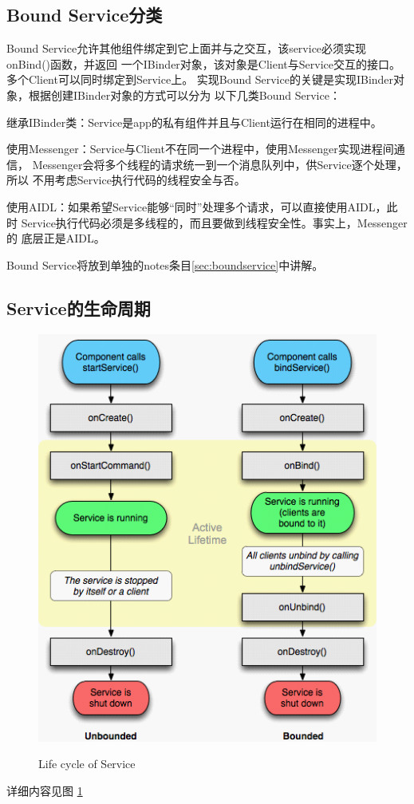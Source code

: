 ﻿\documentclass[a4paper,11pt]{article}
\begin{document}
  \subsection[Bound Service分类]{Bound Service分类}
  Bound Service允许其他组件绑定到它上面并与之交互，该service必须实现onBind()函数，并返回
  一个IBinder对象，该对象是Client与Service交互的接口。多个Client可以同时绑定到Service上。
  实现Bound Service的关键是实现IBinder对象，根据创建IBinder对象的方式可以分为
  以下几类Bound Service：\par
  \begin{coloredenumerate}
    \item 继承IBinder类：Service是app的私有组件并且与Client运行在相同的进程中。
    \item 使用Messenger：Service与Client不在同一个进程中，使用Messenger实现进程间通信，
          Messenger会将多个线程的请求统一到一个消息队列中，供Service逐个处理，所以
          不用考虑Service执行代码的线程安全与否。
    \item 使用AIDL：如果希望Service能够“同时”处理多个请求，可以直接使用AIDL，此时
          Service执行代码必须是多线程的，而且要做到线程安全性。事实上，Messenger的
          底层正是AIDL。
  \end{coloredenumerate}
  Bound Service将放到单独的notes条目\ref{sec:boundservice}中讲解。  
  
  \subsection[Service的生命周期]{Service的生命周期}
  \begin{figure}[ht]
    \centering
    \includegraphics[width=.7\textwidth]{life_cycle_of_service.png}\\
    \caption{Life cycle of Service}\label{fig:service}
  \end{figure}
  详细内容见图 \ref{fig:service}
  
\end{document}

